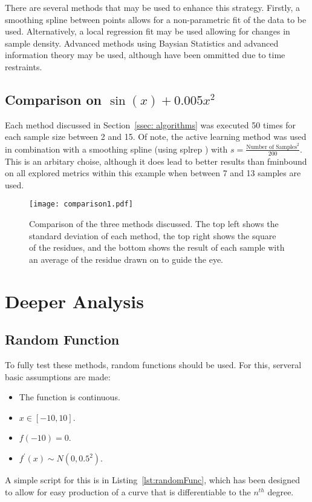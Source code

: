 There are several methods that may be used to enhance this strategy. Firstly, a smoothing spline between points allows for a non-parametric fit of the data to be used. Alternatively, a local regression fit may be used allowing for changes in sample density. Advanced methods using Baysian Statistics and advanced information theory may be used, although have been ommitted due to time restraints.


\subsection[Comparison One]{Comparison on $\sin(x)+0.005x^2$}

Each method discussed in Section~\ref{ssec: algorithms} was executed 50 times for each sample size between 2 and 15. Of note, the active learning method was used in combination with a smoothing spline (using splrep \cite{2020SciPy-NMeth}) with ${s = \frac{\text{Number of Samples}^2}{200}}$. This is an arbitary choise, although it does lead to better results than fminbound on all explored metrics within this example when between 7 and 13 samples are used.

\begin{figure}[htbp!] 
  \centering    
  \texttt{[image: comparison1.pdf]}
  \caption[First Comparison]{Comparison of the three methods discussed. The top left shows the standard deviation of each method, the top right shows the square of the residues, and the bottom shows the result of each sample with an average of the residue drawn on to guide the eye.}
  \label{fig:firstComparison}
\end{figure}

\section{Deeper Analysis}
\subsection{Random Function}
To fully test these methods, random functions should be used. For this, serveral basic assumptions are made:
\begin{itemize}
  \item The function is continuous.
  \item $x\in[-10, 10]$.
  \item $f(-10)=0$.
  \item $f^{\prime}(x)\sim N(0, 0.5^2)$.
\end{itemize}
A simple script for this is in Listing~\ref{lst:randomFunc}, which has been designed to allow for easy production of a curve that is differentiable to the $n^{th}$ degree.

